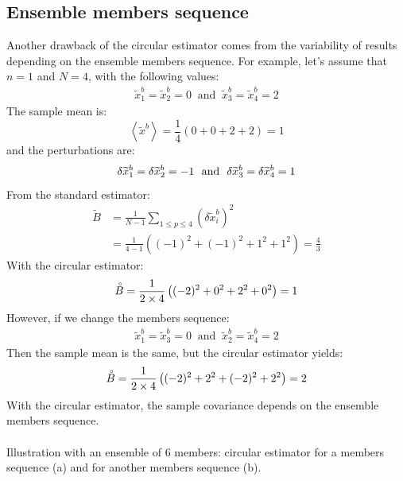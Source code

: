 \documentclass[12pt]{scrartcl}
\begin{document}
\subsection{Ensemble members sequence}
Another drawback of the circular estimator comes from the variability of results depending on the ensemble members sequence. For example, let's assume that $n = 1$ and $N = 4$, with the following values:
\begin{align}
\widetilde{x}^b_1 = \widetilde{x}^b_2 = 0 \ \text{ and } \ \widetilde{x}^b_3 = \widetilde{x}^b_4 = 2
\end{align}
The sample mean is:
\begin{equation}
\left\langle \widetilde{x}^b \right\rangle = \frac{1}{4} \left(0+0+2+2\right) = 1
\end{equation}
and the perturbations are:
\begin{equation}
\delta \widetilde{x}^b_1 = \delta \widetilde{x}^b_2 = -1 \ \text{ and } \ \delta \widetilde{x}^b_3 = \delta \widetilde{x}^b_4 = 1 \\
\end{equation}
From the standard estimator:
\begin{align}
\widetilde{B} & = \frac{1}{N-1} \sum_{1 \le p \le 4} \left(\delta \widetilde{x}^b_i\right)^2 \nonumber \\
& = \frac{1}{4-1} \left((-1)^2+(-1)^2+1^2+1^2\right) = \frac{4}{3}
\end{align}
With the circular estimator:
\begin{align}
\label{eq:wrong_cov_1}
\accentset{\circ}{B} = \frac{1}{2 \times 4} \left((-2)^2+0^2+2^2+0^2\right) = 1
\end{align}
However, if we change the members sequence:
\begin{align}
\widetilde{x}^b_1 = \widetilde{x}^b_3 = 0 \ \text{ and } \ \widetilde{x}^b_2 = \widetilde{x}^b_4 = 2
\end{align}
Then the sample mean is the same, but the circular estimator yields:
\begin{align}
\label{eq:wrong_cov_2}
\accentset{\circ}{B} = \frac{1}{2 \times 4} \left((-2)^2+2^2+(-2)^2+2^2\right) = 2
\end{align}
With the circular estimator, the sample covariance depends on the ensemble members sequence.\\
$  $\\
Illustration with an ensemble of 6 members: circular estimator for a members sequence (a) and for another members sequence (b).
\end{document}
